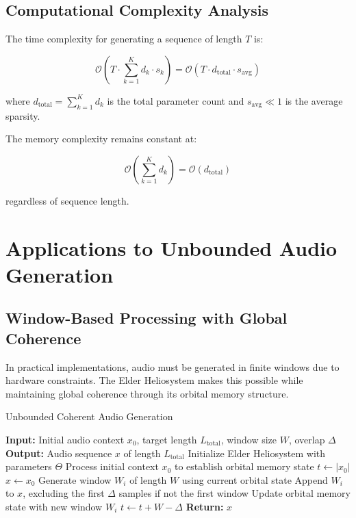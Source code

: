 \subsection{Computational Complexity Analysis}

\begin{corollary}
The time complexity for generating a sequence of length $T$ is:

\begin{equation}
\mathcal{O}(T \cdot \sum_{k=1}^K d_k \cdot s_k) = \mathcal{O}(T \cdot d_{\text{total}} \cdot s_{\text{avg}})
\end{equation}

where $d_{\text{total}} = \sum_{k=1}^K d_k$ is the total parameter count and $s_{\text{avg}} \ll 1$ is the average sparsity.
\end{corollary}

\begin{corollary}
The memory complexity remains constant at:

\begin{equation}
\mathcal{O}(\sum_{k=1}^K d_k) = \mathcal{O}(d_{\text{total}})
\end{equation}

regardless of sequence length.
\end{corollary}

\section{Applications to Unbounded Audio Generation}

\subsection{Window-Based Processing with Global Coherence}

In practical implementations, audio must be generated in finite windows due to hardware constraints. The Elder Heliosystem makes this possible while maintaining global coherence through its orbital memory structure.

\begin{algorithm}
\caption{Unbounded Coherent Audio Generation}
\begin{algorithmic}[1]
\State \textbf{Input:} Initial audio context $x_0$, target length $L_{\text{total}}$, window size $W$, overlap $\Delta$
\State \textbf{Output:} Audio sequence $x$ of length $L_{\text{total}}$
\State Initialize Elder Heliosystem with parameters $\Theta$
\State Process initial context $x_0$ to establish orbital memory state
\State $t \gets |x_0|$
\State $x \gets x_0$
    \State Generate window $W_i$ of length $W$ using current orbital state
    \State Append $W_i$ to $x$, excluding the first $\Delta$ samples if not the first window
    \State Update orbital memory state with new window $W_i$
    \State $t \gets t + W - \Delta$
\EndWhile
\State \textbf{Return:} $x$
\end{algorithmic}
\end{algorithm}

